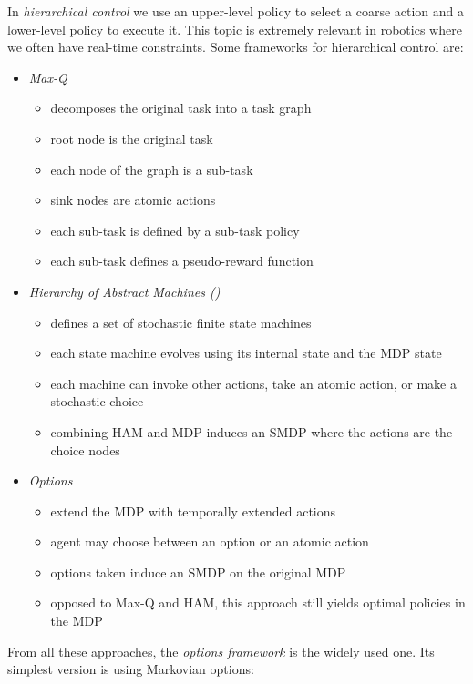 		In \emph{hierarchical control} we use an upper-level policy to select a coarse action and a lower-level policy to execute it. This topic is extremely relevant in robotics where we often have real-time constraints. Some frameworks for hierarchical control are:
		\begin{itemize}
			\item \emph{Max-Q}
				\begin{itemize}
					\item decomposes the original task into a task graph
					\item root node is the original task
					\item each node of the graph is a sub-task
					\item sink nodes are atomic actions
					\item each sub-task is defined by a sub-task policy
					\item each sub-task defines a pseudo-reward function
				\end{itemize}
			\item \emph{Hierarchy of Abstract Machines ()}
				\begin{itemize}
					\item defines a set of stochastic finite state machines
					\item each state machine evolves using its internal state and the \ac{MDP} state
					\item each machine can invoke other actions, take an atomic action, or make a stochastic choice
					\item combining \ac{HAM} and \ac{MDP} induces an \ac{SMDP} where the actions are the choice nodes
				\end{itemize}
			\item \emph{Options}
				\begin{itemize}
					\item extend the \ac{MDP} with temporally extended actions
					\item agent may choose between an option or an atomic action
					\item options taken induce an \ac{SMDP} on the original \ac{MDP}
					\item opposed to Max-Q and \ac{HAM}, this approach still yields optimal policies in the \ac{MDP}
				\end{itemize}
		\end{itemize}
		From all these approaches, the \emph{options framework} is the widely used one. Its simplest version is using Markovian options:
